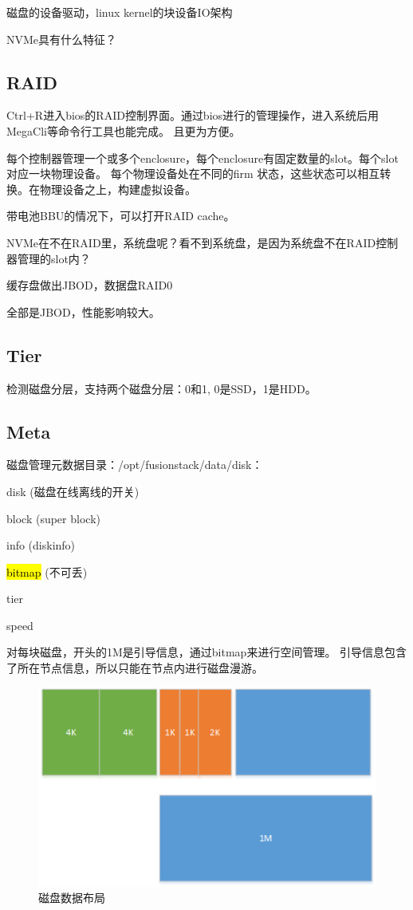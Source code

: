 磁盘的设备驱动，linux kernel的块设备IO架构

NVMe具有什么特征？

\subsection{RAID}

Ctrl+R进入bios的RAID控制界面。通过bios进行的管理操作，进入系统后用MegaCli等命令行工具也能完成。
且更为方便。

每个控制器管理一个或多个enclosure，每个enclosure有固定数量的slot。每个slot对应一块物理设备。
每个物理设备处在不同的firm 状态，这些状态可以相互转换。在物理设备之上，构建虚拟设备。

带电池BBU的情况下，可以打开RAID cache。

NVMe在不在RAID里，系统盘呢？看不到系统盘，是因为系统盘不在RAID控制器管理的slot内？

缓存盘做出JBOD，数据盘RAID0

全部是JBOD，性能影响较大。

\subsection{Tier}

检测磁盘分层，支持两个磁盘分层：0和1, 0是SSD，1是HDD。

\subsection{Meta}

磁盘管理元数据目录：/opt/fusionstack/data/disk：
\begin{compactitem}
\item disk (磁盘在线离线的开关)
\item block (super block)
\item info (diskinfo)
\item \hl{bitmap} (不可丢)
\item tier
\item speed
\end{compactitem}

对每块磁盘，开头的1M是引导信息，通过bitmap来进行空间管理。
引导信息包含了所在节点信息，所以只能在节点内进行磁盘漫游。

\begin{figure}[h]
    \centering
    \includegraphics{../images/disk_layout.png}
    \caption{磁盘数据布局}
\end{figure}

